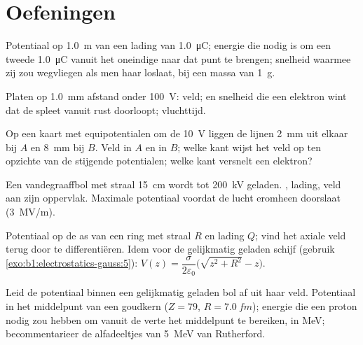 \section{Oefeningen}

\begin{exercise}[$\star$]\label{exo:b1:potential-capacitors:1}
Potentiaal op \qty{1.0}{m} van een lading van \qty{1.0}{\micro C}; energie die nodig is
om een tweede \qty{1.0}{\micro C} vanuit het oneindige naar dat punt te brengen; snelheid
waarmee zij zou wegvliegen als men haar loslaat, bij een massa van \qty{1}{g}.
\end{exercise}

\begin{exercise}[$\star$]\label{exo:b1:potential-capacitors:2}
Platen op \qty{1.0}{mm} afstand onder \qty{100}{V}: veld;  en
snelheid die een elektron wint dat de spleet vanuit rust doorloopt; vluchttijd.
\end{exercise}

\begin{exercise}[$\star$]\label{exo:b1:potential-capacitors:3}
Op een kaart met equipotentialen om de \qty{10}{V} liggen de lijnen
\qty{2}{mm} uit elkaar bij $A$ en \qty{8}{mm} bij $B$. Veld in $A$
en in $B$; welke kant wijst het veld op ten opzichte van de stijgende
potentialen; welke kant versnelt een elektron?
\end{exercise}

\begin{exercise}[$\star$]\label{exo:b1:potential-capacitors:4}
Een vandegraaffbol met straal \qty{15}{cm} wordt tot \qty{200}{kV} geladen.
, lading, veld aan zijn oppervlak. Maximale potentiaal voordat
de lucht eromheen doorslaat (\qty{3}{MV/m}).
\end{exercise}

\begin{exercise}[$\star\star$]\label{exo:b1:potential-capacitors:5}
Potentiaal op de as van een ring met straal $R$ en lading $Q$; vind het
axiale veld terug door te differentiëren. Idem voor de gelijkmatig geladen schijf
(gebruik \cref{exo:b1:electrostatics-gauss:5}): $V(z) = \dfrac{\sigma}{2\varepsilon_0}
\bigl(\sqrt{z^2 + R^2} - z\bigr)$.
\end{exercise}

\begin{exercise}[$\star\star$]\label{exo:b1:potential-capacitors:6}
Leid de potentiaal binnen een gelijkmatig geladen bol af uit haar veld.
Potentiaal in het middelpunt van een goudkern ($Z = 79$, $R = \qty{7.0}{fm}$);
energie die een proton nodig zou hebben om vanuit de verte het middelpunt te bereiken, in
\unit{MeV}; becommentarieer de alfadeeltjes van \qty{5}{MeV} van Rutherford.
\end{exercise}

